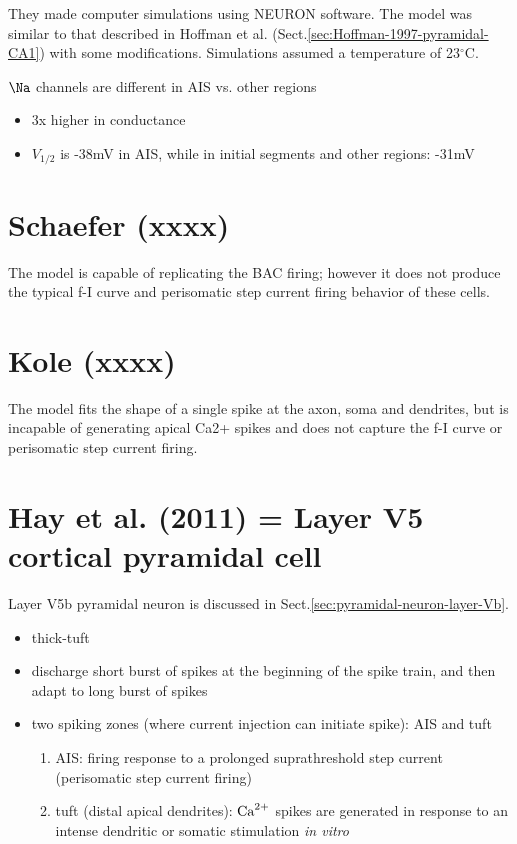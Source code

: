 They made computer simulations using NEURON software. The model was
similar to that described in Hoffman et al.
(Sect.\ref{sec:Hoffman-1997-pyramidal-CA1}) with some modifications.
Simulations assumed a temperature of 23$^\circ$C.

$\Na$ channels are different in AIS vs. other regions
\begin{itemize}
  \item 3x higher in conductance
  \item $V_{1/2}$ is -38mV in AIS, while in initial segments and other regions:
  -31mV
\end{itemize}

\section{Schaefer (xxxx)}

The model is capable of replicating the BAC firing; however it does not produce
the typical f-I curve and perisomatic step current firing behavior of these
cells.

\section{Kole (xxxx)}

The model fits the shape of a single spike at the
axon, soma and dendrites, but is incapable of generating apical
Ca2+ spikes and does not capture the f-I curve or perisomatic step
current firing.

\section{Hay et al. (2011) = Layer V5 cortical pyramidal cell}
\label{sec:Hay-2011}

Layer V5b pyramidal neuron is discussed in
Sect.\ref{sec:pyramidal-neuron-layer-Vb}.
\begin{itemize}
  \item thick-tuft 
  
  \item discharge short burst of spikes at the beginning of the spike train, and
  then adapt to long burst of spikes
  
  \item two spiking zones (where current injection can initiate spike): AIS and
  tuft
  \begin{enumerate}
    
    \item AIS: firing response to a prolonged suprathreshold step current
    (perisomatic step current firing)

    \item tuft (distal apical dendrites): ${\text{Ca}^{2+}}$ spikes are generated in response
    to an intense dendritic or somatic stimulation {\it in vitro}
    
  \end{enumerate}
\end{itemize}

